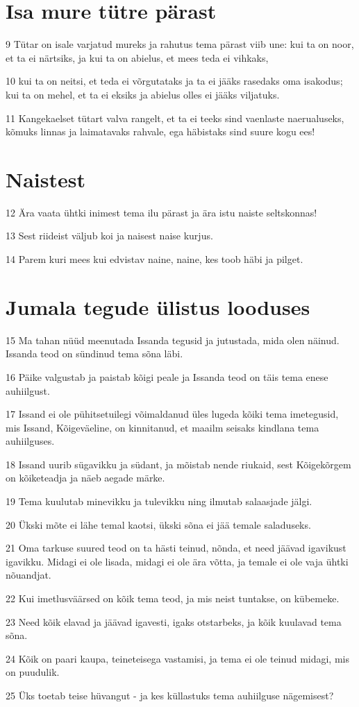 \section*{Isa mure tütre pärast}

\par 9 Tütar on isale varjatud mureks ja rahutus tema pärast viib une: kui ta on noor, et ta ei närtsiks, ja kui ta on abielus, et mees teda ei vihkaks,
\par 10 kui ta on neitsi, et teda ei võrgutataks ja ta ei jääks rasedaks oma isakodus; kui ta on mehel, et ta ei eksiks ja abielus olles ei jääks viljatuks.
\par 11 Kangekaelset tütart valva rangelt, et ta ei teeks sind vaenlaste naerualuseks, kõmuks linnas ja laimatavaks rahvale, ega häbistaks sind suure kogu ees!

\section*{Naistest}

\par 12 Ära vaata ühtki inimest tema ilu pärast ja ära istu naiste seltskonnas!
\par 13 Sest riideist väljub koi ja naisest naise kurjus.
\par 14 Parem kuri mees kui edvistav naine, naine, kes toob häbi ja pilget.

\section*{Jumala tegude ülistus looduses}

\par 15 Ma tahan nüüd meenutada Issanda tegusid ja jutustada, mida olen näinud. Issanda teod on sündinud tema sõna läbi.
\par 16 Päike valgustab ja paistab kõigi peale ja Issanda teod on täis tema enese auhiilgust.
\par 17 Issand ei ole pühitsetuilegi võimaldanud üles lugeda kõiki tema imetegusid, mis Issand, Kõigeväeline, on kinnitanud, et maailm seisaks kindlana tema auhiilguses.
\par 18 Issand uurib sügavikku ja südant, ja mõistab nende riukaid, sest Kõigekõrgem on kõiketeadja ja näeb aegade märke.
\par 19 Tema kuulutab minevikku ja tulevikku ning ilmutab salaasjade jälgi.
\par 20 Ükski mõte ei lähe temal kaotsi, ükski sõna ei jää temale saladuseks.
\par 21 Oma tarkuse suured teod on ta hästi teinud, nõnda, et need jäävad igavikust igavikku. Midagi ei ole lisada, midagi ei ole ära võtta, ja temale ei ole vaja ühtki nõuandjat.
\par 22 Kui imetlusväärsed on kõik tema teod, ja mis neist tuntakse, on kübemeke.
\par 23 Need kõik elavad ja jäävad igavesti, igaks otstarbeks, ja kõik kuulavad tema sõna.
\par 24 Kõik on paari kaupa, teineteisega vastamisi, ja tema ei ole teinud midagi, mis on puudulik.
\par 25 Üks toetab teise hüvangut - ja kes küllastuks tema auhiilguse nägemisest?

